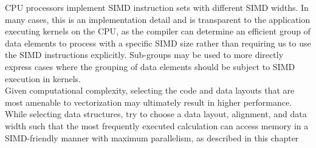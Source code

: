 \begin{tcolorbox}[colback=blue!5!white,colframe=blue!75!black, title=SIMD VECTORIZATION GUIDELINES]
CPU processors implement SIMD instruction sets with different SIMD widths. In many cases, this is an implementation detail and is transparent to the application executing kernels on the CPU, as the compiler can determine an efficient group of data elements to process with a specific SIMD size rather than requiring us to use the SIMD instructions explicitly. Sub-groups may be used to more directly express cases where the grouping of data elements should be subject to SIMD execution in kernels.\\

Given computational complexity, selecting the code and data layouts that are most amenable to vectorization may ultimately result in higher performance. While selecting data structures, try to choose a data layout, alignment, and data width such that the most frequently executed calculation can access memory in a SIMD-friendly manner with maximum parallelism, as described in this chapter
\end{tcolorbox}








